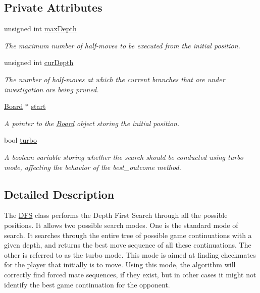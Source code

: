 \subsection*{Private Attributes}
\begin{DoxyCompactItemize}
\item 
\mbox{\label{classDFS_aacbeeaf0eebb3a37ad25b0c42bd27e64}} 
unsigned int \hyperlink{classDFS_aacbeeaf0eebb3a37ad25b0c42bd27e64}{max\+Depth}
\begin{DoxyCompactList}\small\item\em The maximum number of half-\/moves to be executed from the initial position. \end{DoxyCompactList}\item 
\mbox{\label{classDFS_a17abe1c016f7efe83c51c4ee9ba541f3}} 
unsigned int \hyperlink{classDFS_a17abe1c016f7efe83c51c4ee9ba541f3}{cur\+Depth}
\begin{DoxyCompactList}\small\item\em The number of half-\/moves at which the current branches that are under investigation are being pruned. \end{DoxyCompactList}\item 
\mbox{\label{classDFS_a34ffac99b64c8f83889e66d47fa94787}} 
\hyperlink{classBoard}{Board} $\ast$ \hyperlink{classDFS_a34ffac99b64c8f83889e66d47fa94787}{start}
\begin{DoxyCompactList}\small\item\em A pointer to the \hyperlink{classBoard}{Board} object storing the initial position. \end{DoxyCompactList}\item 
\mbox{\label{classDFS_a3c4278e719f9a1d9766b4d5c60548137}} 
bool \hyperlink{classDFS_a3c4278e719f9a1d9766b4d5c60548137}{turbo}
\begin{DoxyCompactList}\small\item\em A boolean variable storing whether the search should be conducted using turbo mode, affecting the behavior of the best\+\_\+outcome method. \end{DoxyCompactList}\end{DoxyCompactItemize}


\subsection{Detailed Description}
The \hyperlink{classDFS}{D\+FS} class performs the Depth First Search through all the possible positions. It allows two possible search modes. One is the standard mode of search. It searches through the entire tree of possible game continuations with a given depth, and returns the best move sequence of all these continuations. The other is referred to as the turbo mode. This mode is aimed at finding checkmates for the player that initially is to move. Using this mode, the algorithm will correctly find forced mate sequences, if they exist, but in other cases it might not identify the best game continuation for the opponent. 

